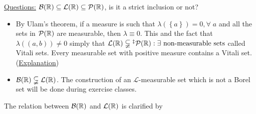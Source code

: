 \noindent\underline{Questions:} \(\mathcal{B}(\mathbb{R}) \subseteq \mathcal{L}(\mathbb{R}) \subseteq \mathcal{P}(\mathbb{R})\), is it a strict inclusion or not?
\begin{itemize}
    \item By Ulam's theorem, if a measure is such that \(\lambda \left(\left\{ a \right\}\right) = 0, \forall \; a\) and all the sets in \(\mathcal{P}(\mathbb{R})\) are measurable, then \(\lambda \equiv 0\). This and the fact that \(\lambda\left(\left(a,b\right)\right) \not = 0\) simply that \(\mathcal{L}(\real) \subsetneqq\symbolfootnotemark[3]{I had no choice} \mathcal{P}(\real) : \exists \mbox{ non-measurable sets}\) called Vitali sets. Every measurable set with positive measure contains a Vitali set. (\href{https://math.stackexchange.com/questions/137949/the-construction-of-a-vitali-set}{Explanation})
    \item \(\mathcal{B}(\mathbb{R}) \subsetneqq \mathcal{L}(\mathbb{R})\). The construction of an \(\mathcal{L}\)-measurable set which is not a Borel set will be done during exercise classes.
\end{itemize}
The relation between \(\mathcal{B}(\mathbb{R})\) and \(\mathcal{L}(\mathbb{R})\) is clarified by 
